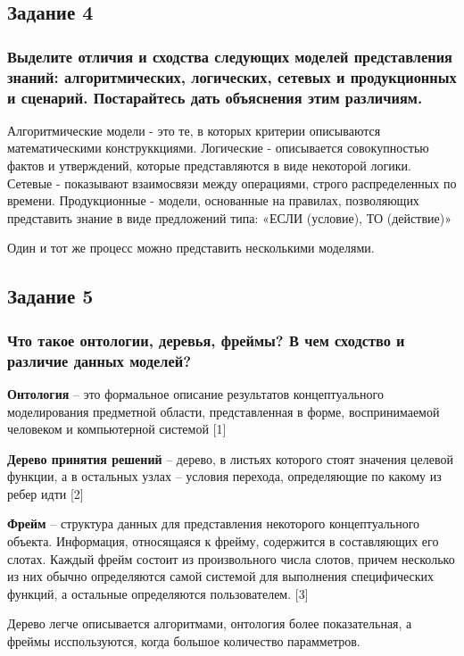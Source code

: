 \documentclass[14pt,a4paper,report]{report}
\begin{document}
\subsection{Задание 4}

\subsubsection{Выделите отличия и сходства следующих моделей представления знаний: алгоритмических, логических, сетевых и продукционных и сценарий. Постарайтесь дать объяснения этим различиям.}

Алгоритмические модели - это те, в которых критерии описываются математическими конструккциями. Логические - описывается совокупностью фактов и утверждений, которые представляются в виде некоторой логики. Сетевые - показывают взаимосвязи между операциями, строго распределенных по времени. Продукционные - модели, основанные на правилах, позволяющих представить знание в виде предложений типа: «ЕСЛИ (условие), ТО (действие)» 

Один и тот же процесс можно представить несколькими моделями. 

\subsection{Задание 5}

\subsubsection{Что такое онтологии, деревья, фреймы? В чем сходство и различие данных моделей?}

\textbf{Онтология} -- это формальное описание результатов концептуального моделирования предметной области, представленная в форме, воспринимаемой человеком и компьютерной системой [1]

\textbf{Дерево принятия решений} -- дерево, в листьях которого стоят значения целевой функции, а в остальных узлах -- условия перехода, определяющие по какому из ребер идти [2]

\textbf{Фрейм} -- структура данных для представления некоторого концептуального объекта. Информация, относящаяся к фрейму, содержится в составляющих его слотах. Каждый фрейм состоит из произвольного числа слотов, причем несколько из них обычно определяются самой системой для выполнения специфических функций, а остальные определяются пользователем. [3]

Дерево легче описывается алгоритмами, онтология более показательная, а фреймы исспользуются, когда большое количество парамметров.
\end{document}
